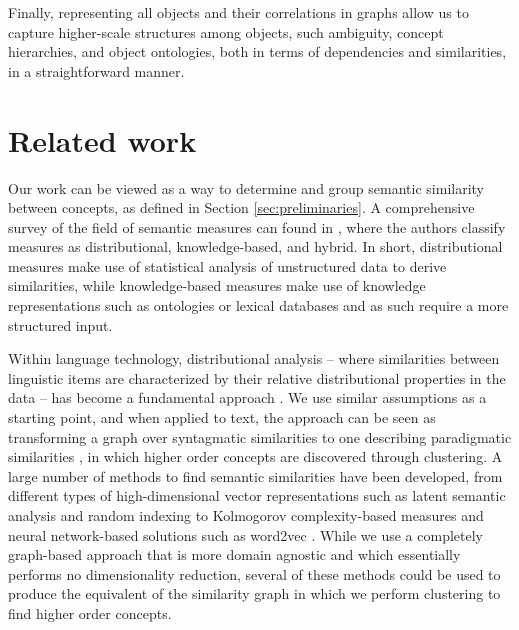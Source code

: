 \documentclass{sig-alternate}
\begin{document}
\begin{sloppypar} Finally, representing all objects and their correlations in graphs allow us to capture higher-scale
structures among objects, such ambiguity, concept hierarchies, and object ontologies, both in terms of dependencies and
similarities, in a straightforward manner.
\end{sloppypar}

\section{Related work}

Our work can be viewed as a way to determine and group semantic similarity between concepts, as defined in Section
\ref{sec:preliminaries}. A comprehensive survey of the field of semantic measures can found in
\cite{harispe2013semantic}, where the authors classify measures as distributional, knowledge-based, and hybrid.
In short, distributional measures make use of statistical analysis of unstructured data to derive
similarities, while knowledge-based measures make use of knowledge representations such as ontologies or lexical databases
and as such require a more structured input.

\begin{sloppypar}
Within language technology, distributional analysis -- where similarities between linguistic items are characterized by
their relative distributional properties in the data -- has become a fundamental approach \cite{Harris-1970}. We use
similar assumptions as a starting point, and when applied to text, the approach can be seen as transforming a graph
over syntagmatic similarities to one describing paradigmatic similarities \cite{Sahlgren-2006}, in which higher order
concepts are discovered through clustering. A large number of methods to find semantic similarities have been
developed, from different types of high-dimensional vector representations such as latent semantic analysis
\cite{Landauer-1998} and random indexing \cite{kanerva:hyperdimensional} to Kolmogorov complexity-based measures
\cite{Cilibrasi-2007} and neural network-based solutions such as word2vec \cite{Mikolov-2013}. While we use a
completely graph-based approach that is more domain agnostic and which essentially performs no dimensionality
reduction, several of these methods could be used to produce the equivalent of the similarity graph in which we perform
clustering to find higher order concepts.
\end{sloppypar}
\end{document}
